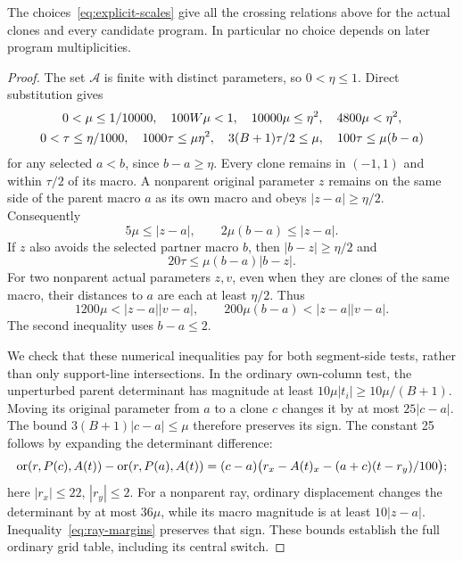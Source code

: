 \begin{lemma}\label{lem:common-scales}
The choices~\eqref{eq:explicit-scales} give all the crossing relations above for the actual clones and every candidate program. In particular no choice depends on later program multiplicities.
\end{lemma}
\begin{proof}
The set $\mathcal A$ is finite with distinct parameters, so $0<\eta\leq1$. Direct substitution gives
\begin{gather}
0<\mu\leq1/10000,\quad 100W\mu<1,\quad
10000\mu\leq\eta^2,\quad 4800\mu<\eta^2,\notag\\
0<\tau\leq\eta/1000,\quad 1000\tau\leq\mu\eta^2,\quad
3(B+1)\tau/2\leq\mu,\quad
100\tau\leq\mu(b-a)
\label{eq:scale-margins}
\end{gather}
for any selected $a<b$, since $b-a\geq\eta$. Every clone remains in $(-1,1)$ and within $\tau/2$ of its macro. A nonparent original parameter $z$ remains on the same side of the parent macro $a$ as its own macro and obeys $|z-a|\geq\eta/2$. Consequently
\begin{equation}\label{eq:ray-margins}
5\mu\leq|z-a|,\qquad 2\mu(b-a)\leq|z-a|.
\end{equation}
If $z$ also avoids the selected partner macro $b$, then $|b-z|\geq\eta/2$ and
\begin{equation}\label{eq:partner-margin}
20\tau\leq\mu(b-a)|b-z|.
\end{equation}
For two nonparent actual parameters $z,v$, even when they are clones of the same macro, their distances to $a$ are each at least $\eta/2$. Thus
\begin{equation}\label{eq:curvature-margins}
1200\mu<|z-a||v-a|,\qquad
200\mu(b-a)<|z-a||v-a|.
\end{equation}
The second inequality uses $b-a\leq2$.

We check that these numerical inequalities pay for both segment-side tests, rather than only support-line intersections. In the ordinary own-column test, the unperturbed parent determinant has magnitude at least $10\mu|t_i|\geq10\mu/(B+1)$. Moving its original parameter from $a$ to a clone $c$ changes it by at most $25|c-a|$. The bound $3(B+1)|c-a|\leq\mu$ therefore preserves its sign. The constant 25 follows by expanding the determinant difference:
\[
\operatorname{or}(r,P(c),A(t))-\operatorname{or}(r,P(a),A(t))
=(c-a)\bigl(r_x-A(t)_x-(a+c)(t-r_y)/100\bigr);
\]
here $|r_x|\leq22$, $|r_y|\leq2$. For a nonparent ray, ordinary displacement changes the determinant by at most $36\mu$, while its macro magnitude is at least $10|z-a|$. Inequality~\eqref{eq:ray-margins} preserves that sign. These bounds establish the full ordinary grid table, including its central switch.


\end{proof}
